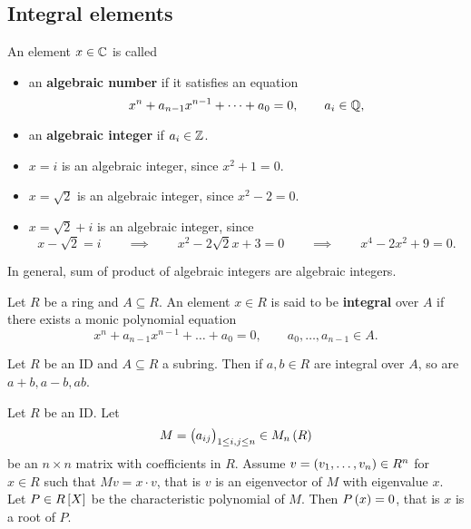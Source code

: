 \pagebreak

\subsection{Integral elements}

\begin{definition}
An element $ x \in \mathbb{C} $ is called
\begin{itemize}
\item an \textbf{algebraic number} if it satisfies an equation
$$ x^n + a_{n - 1}x^{n - 1} + \dots + a_0 = 0, \qquad a_i \in \mathbb{Q}, $$
\item an \textbf{algebraic integer} if $ a_i \in \mathbb{Z} $.
\end{itemize}
\end{definition}

\begin{example*}
\hfill
\begin{itemize}
\item $ x = i $ is an algebraic integer, since $ x^2 + 1 = 0 $.
\item $ x = \sqrt{2} $ is an algebraic integer, since $ x^2 - 2 = 0 $.
\item $ x = \sqrt{2} + i $ is an algebraic integer, since
$$ x - \sqrt{2} = i \qquad \implies \qquad x^2 - 2\sqrt{2}x + 3 = 0 \qquad \implies \qquad x^4 - 2x^2 + 9 = 0. $$
\end{itemize}
\end{example*}

In general, sum of product of algebraic integers are algebraic integers.

\begin{definition}
Let $ R $ be a ring and $ A \subseteq R $. An element $ x \in R $ is said to be \textbf{integral} over $ A $ if there exists a monic polynomial equation
$$ x^n + a_{n - 1}x^{n - 1} + \dots + a_0 = 0, \qquad a_0, \dots, a_{n - 1} \in A. $$
\end{definition}

\begin{theorem}
\label{thm:integralsubring}
Let $ R $ be an ID and $ A \subseteq R $ a subring. Then if $ a, b \in R $ are integral over $ A $, so are $ a + b, a - b, ab $.
\end{theorem}

\begin{lemma}
\label{lem:cayleyhamilton}
Let $ R $ be an ID. Let
$$ M = \br{a_{ij}}_{1 \le i, j \le n} \in M_n\br{R} $$
be an $ n \times n $ matrix with coefficients in $ R $. Assume $ v = \br{v_1, \dots, v_n} \in R^n $ for $ x \in R $ such that $ Mv = x \cdot v $, that is $ v $ is an eigenvector of $ M $ with eigenvalue $ x $. Let $ P \in R\sbr{X} $ be the characteristic polynomial of $ M $. Then $ P\br{x} = 0 $, that is $ x $ is a root of $ P $.
\end{lemma}

